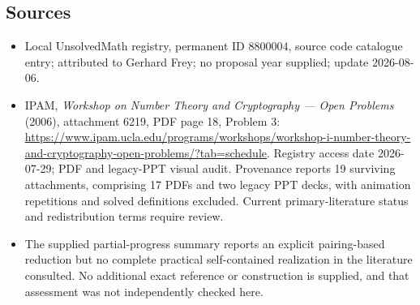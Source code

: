 \documentclass[11pt]{article}
\begin{document}
\subsection{Sources}
\begin{itemize}
\item Local UnsolvedMath registry, permanent ID 8800004, source code catalogue entry; attributed to Gerhard Frey; no proposal year supplied; update 2026-08-06.
\item IPAM, \emph{Workshop on Number Theory and Cryptography --- Open Problems} (2006), attachment 6219, PDF page 18, Problem 3: \url{https://www.ipam.ucla.edu/programs/workshops/workshop-i-number-theory-and-cryptography-open-problems/?tab=schedule}. Registry access date 2026-07-29; PDF and legacy-PPT visual audit. Provenance reports 19 surviving attachments, comprising 17 PDFs and two legacy PPT decks, with animation repetitions and solved definitions excluded. Current primary-literature status and redistribution terms require review.
\item The supplied partial-progress summary reports an explicit pairing-based reduction but no complete practical self-contained realization in the literature consulted. No additional exact reference or construction is supplied, and that assessment was not independently checked here.
\end{itemize}
\end{document}
